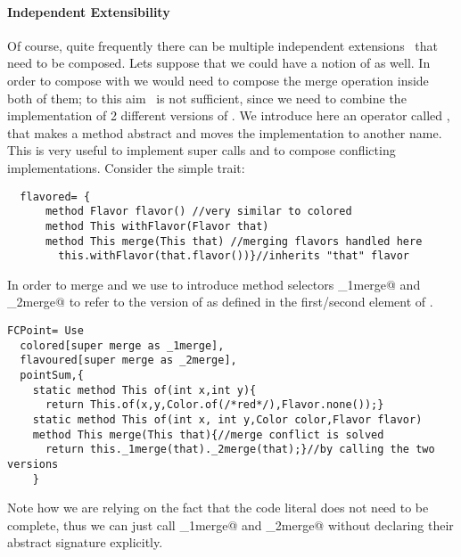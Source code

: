 \paragraph{Independent Extensibility}
  Of course, quite frequently there can be multiple independent
  extensions~\cite{Zenger-Odersky2005} that need to be composed. Lets suppose that 
  we could have a notion of \Q@flavoured@ as well.   
  In order to compose \Q@colored@ with \Q@flavored@ we would
  need to compose the merge operation inside both of them; to this aim \use\ is not sufficient, since we need to combine the implementation of 2 different versions of \Q@merge@.
We introduce here an operator called \Q@super@, that
 makes a method abstract and
moves the implementation to another name. This is very useful to implement super calls
 and to compose conflicting implementations.
\noindent Consider the simple \Q@flavored@ trait:
\saveSpace\saveSpace \begin{lstlisting}
  flavored= {
      method Flavor flavor() //very similar to colored
      method This withFlavor(Flavor that)
      method This merge(This that) //merging flavors handled here
        this.withFlavor(that.flavor())}//inherits "that" flavor
\end{lstlisting}  \saveSpace\saveSpace

\noindent In order to merge \Q@colored@ and \Q@flavored@ we use  \Q@super@ to introduce method selectors \Q@_1merge@ and \Q@_2merge@
to refer to the version of \Q@merge@ as defined in the first/second element of \use.

\saveSpace\saveSpace \begin{lstlisting}
FCPoint= Use
  colored[super merge as _1merge],
  flavoured[super merge as _2merge],
  pointSum,{
    static method This of(int x,int y){
      return This.of(x,y,Color.of(/*red*/),Flavor.none());}
    static method This of(int x, int y,Color color,Flavor flavor)
    method This merge(This that){//merge conflict is solved 
      return this._1merge(that)._2merge(that);}//by calling the two versions
    }
\end{lstlisting}  \saveSpace\saveSpace

Note how we are relying on the fact that the code literal
 does not need to be complete, 
thus we can just call \Q@_1merge@ and \Q@_2merge@ without
 declaring their abstract signature explicitly.



